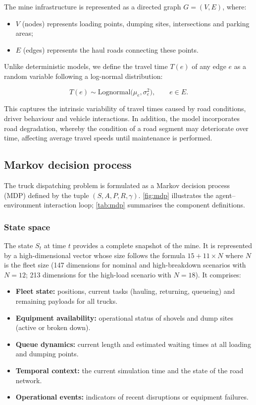 \documentclass[11pt,a4paper]{article}
\begin{document}
The mine infrastructure is represented as a directed graph $G = (V, E)$, where:

\begin{itemize}
  \item $V$ (nodes) represents loading points, dumping sites, intersections and parking areas;
  \item $E$ (edges) represents the haul roads connecting these points.
\end{itemize}

Unlike deterministic models, we define the travel time $T(e)$ of any edge $e$ as a random variable following a log-normal distribution:

\begin{equation}
T(e) \sim \mathrm{Lognormal}\big(\mu_e, \sigma_e^2\big), \qquad e \in E .
\end{equation}

This captures the intrinsic variability of travel times caused by road conditions, driver behaviour and vehicle interactions. In addition, the model incorporates road degradation, whereby the condition of a road segment may deteriorate over time, affecting average travel speeds until maintenance is performed.

\subsection{Markov decision process}

The truck dispatching problem is formulated as a Markov decision process (MDP) defined by the tuple $(S, A, P, R, \gamma)$. \cref{fig:mdp} illustrates the agent--environment interaction loop; \cref{tab:mdp} summarises the component definitions.

\subsubsection{State space}

The state $S_t$ at time $t$ provides a complete snapshot of the mine. It is represented by a high-dimensional vector whose size follows the formula $15 + 11 \times N$ where $N$ is the fleet size (147 dimensions for nominal and high-breakdown scenarios with $N=12$; 213 dimensions for the high-load scenario with $N=18$). It comprises:

\begin{itemize}
  \item \textbf{Fleet state:} positions, current tasks (hauling, returning, queueing) and remaining payloads for all trucks.
  \item \textbf{Equipment availability:} operational status of shovels and dump sites (active or broken down).
  \item \textbf{Queue dynamics:} current length and estimated waiting times at all loading and dumping points.
  \item \textbf{Temporal context:} the current simulation time and the state of the road network.
  \item \textbf{Operational events:} indicators of recent disruptions or equipment failures.
\end{itemize}
\end{document}

